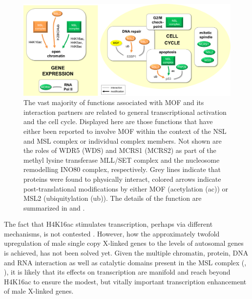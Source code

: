 \begin{figure}[b!]
\includegraphics[width=1\textwidth]{Figures/Functions.png}
\begin{footnotesize}
\caption[Molecular functions of MOF and its interaction partners in transcription activation and cell-cycle-related processes.]{\textsf{The vast majority of functions associated with MOF and its interaction partners are related to general transcriptional activation and the cell cycle. Displayed here are those functions that have either been reported to involve MOF within the context of the NSL and MSL complex or individual complex members. Not shown are the roles of WDR5 (WDS) and MCRS1 (MCRS2) as part of the methyl lysine transferase MLL/SET complex and the nucleosome remodelling INO80 complex, respectively.
Grey lines indicate that proteins were found to physically interact, colored arrows indicate post-translational modifications by either MOF (acetylation (ac)) or MSL2 (ubiquitylation (ub)). The details of the function are summarized in  and .
}}
\label{fig:functions}
\end{footnotesize}
\end{figure}
The fact that H4K16ac stimulates transcription, perhaps via different mechanisms, is not contested \citep{Birchler2003, Conrad2011}. However, how the approximately twofold upregulation of male single copy X-linked genes to the levels of autosomal genes \citep{Hamada2005, Straub2005} is achieved, has not been solved yet. Given the multiple chromatin, protein, DNA and RNA interaction as well as catalytic domains present in the MSL complex (, ), it is likely that its effects on transcription are manifold and reach beyond H4K16ac to ensure the modest, but vitally important transcription enhancement of male X-linked genes.\\
\begin{minipage}{\textwidth}
\setlength{\abovecaptionskip}{-2ex}
\setlength{\belowcaptionskip}{-2ex}


\end{minipage}
%
